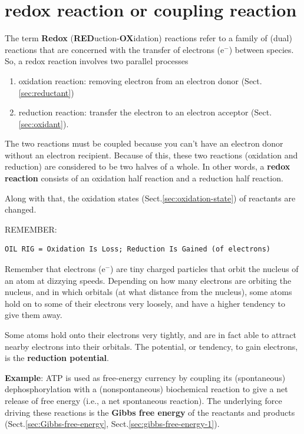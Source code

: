 \section{redox reaction or coupling reaction}
\label{sec:redox-reaction}
\label{sec:oxidation-reduction-reaction}
\label{sec:coupling-reaction}

The term {\bf Redox} ({\bf RED}uction-{\bf OX}idation) reactions refer to a
family of (dual) reactions that are concerned with the transfer of electrons
(e$^-$) between species. So, a redox reaction involves two parallel processes
\begin{enumerate}
  \item oxidation reaction: removing electron from an electron donor
  (Sect.\ref{sec:reductant})
  \item reduction reaction: transfer the electron to an electron acceptor
(Sect.\ref{sec:oxidant}).
\end{enumerate}

The two reactions must be coupled because you can't have an electron donor
without an electron recipient. Because of this, these two reactions (oxidation
and reduction) are considered to be two halves of a whole. In other words, a
{\bf redox reaction} consists of an oxidation half reaction and a reduction half reaction.

Along with that, the oxidation states (Sect.\ref{sec:oxidation-state}) of
reactants are changed. 

REMEMBER:
\begin{verbatim}
OIL RIG = Oxidation Is Loss; Reduction Is Gained (of electrons)
\end{verbatim}

\begin{mdframed}

Remember that electrons (e$^{-}$) are tiny charged particles that orbit the
nucleus of an atom at dizzying speeds. Depending on how many electrons are
orbiting the nucleus, and in which orbitals (at what distance from the nucleus),
some atoms hold on to some of their electrons very loosely, and have a higher
tendency to give them away.

Some atoms hold onto their electrons very tightly, and are in fact able to
attract nearby electrons into their orbitals.
The potential, or tendency, to gain electrons, is the {\bf reduction potential}.
\end{mdframed}

{\bf Example}: ATP is used as free-energy currency by coupling its (spontaneous)
dephosphorylation with a (nonspontaneous) biochemical reaction to give a net
release of free energy (i.e., a net spontaneous reaction). The underlying force
driving these reactions is the {\bf Gibbs free energy} of the reactants and products
(Sect.\ref{sec:Gibbs-free-energy}, Sect.\ref{sec:gibbs-free-energy-1}).


